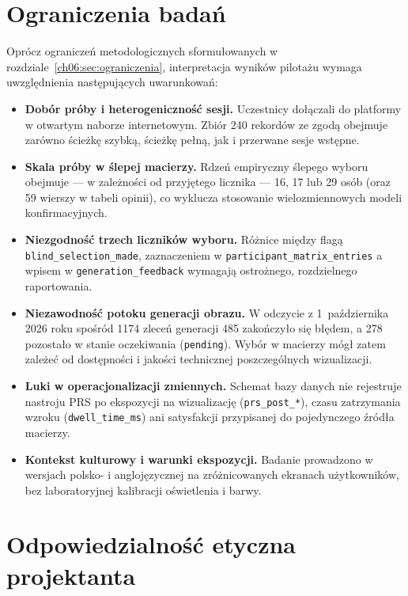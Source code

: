 \section{Ograniczenia badań}
\label{ch09:sec:ograniczenia}

Oprócz ograniczeń metodologicznych sformułowanych w rozdziale~\ref{ch06:sec:ograniczenia}, interpretacja wyników pilotażu wymaga uwzględnienia następujących uwarunkowań:

\begin{itemize}
  \item \textbf{Dobór próby i heterogeniczność sesji.} Uczestnicy dołączali do platformy w otwartym naborze internetowym. Zbiór 240 rekordów ze zgodą obejmuje zarówno ścieżkę szybką, ścieżkę pełną, jak i przerwane sesje wstępne.
  \item \textbf{Skala próby w ślepej macierzy.} Rdzeń empiryczny ślepego wyboru obejmuje --- w zależności od przyjętego licznika --- 16, 17 lub 29 osób (oraz 59 wierszy w tabeli opinii), co wyklucza stosowanie wielozmiennowych modeli konfirmacyjnych.
  \item \textbf{Niezgodność trzech liczników wyboru.} Różnice między flagą \texttt{blind\_selection\_made}, zaznaczeniem w \texttt{participant\_matrix\_entries} a wpisem w \texttt{generation\_feedback} wymagają ostrożnego, rozdzielnego raportowania.
  \item \textbf{Niezawodność potoku generacji obrazu.} W odczycie z 1~października 2026 roku spośród 1174 zleceń generacji 485 zakończyło się błędem, a 278 pozostało w stanie oczekiwania (\texttt{pending}). Wybór w macierzy mógł zatem zależeć od dostępności i jakości technicznej poszczególnych wizualizacji.
  \item \textbf{Luki w operacjonalizacji zmiennych.} Schemat bazy danych nie rejestruje nastroju PRS po ekspozycji na wizualizację (\texttt{prs\_post\_*}), czasu zatrzymania wzroku (\texttt{dwell\_time\_ms}) ani satysfakcji przypisanej do pojedynczego źródła macierzy.
  \item \textbf{Kontekst kulturowy i warunki ekspozycji.} Badanie prowadzono w wersjach polsko- i anglojęzycznej na zróżnicowanych ekranach użytkowników, bez laboratoryjnej kalibracji oświetlenia i barwy.
\end{itemize}

\section{Odpowiedzialność etyczna projektanta}
\label{ch09:sec:etyka}

